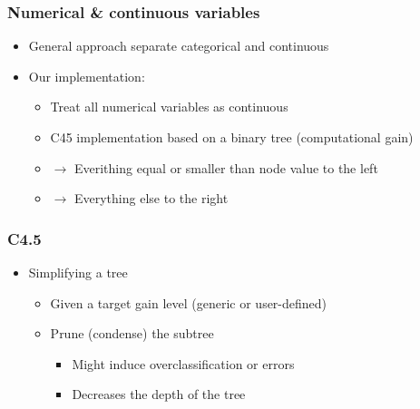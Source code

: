 \begin{frame}
\frametitle{Numerical \& continuous variables}
\begin{itemize}
\item General approach separate categorical and continuous
\vfill
\item Our implementation:
\begin{itemize}
\vfill
\item Treat all numerical variables as continuous
\vfill
\item C45 implementation based on  a binary tree (computational gain)
\vfill
\item $\rightarrow$ Everithing equal or smaller than node value to the left
\vfill
\item $\rightarrow$ Everything else to the right
\end{itemize}
\end{itemize}
\end{frame}
\begin{frame}
\frametitle{C4.5}
\begin{itemize}
\item Simplifying a tree
\vfill
\begin{itemize}
\item Given a target gain level (generic or user-defined)
\vfill
\item Prune (condense) the subtree
\vfill
\begin{itemize}
\item Might induce overclassification or errors
\vfill
\item Decreases the depth of the tree 
\vfill
\end{itemize}
\end{itemize}
\end{itemize}
\end{frame}